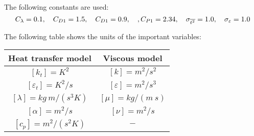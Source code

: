 The following constants are used:
\begin{equation}
C_\lambda=0.1, \quad C_{D1}=1.5, \quad C_{D1}=0.9, \quad, C_{P1}=2.34, \quad \sigma_{\overline{t^2}}=1.0, \quad \sigma_{{\varepsilon}}=1.0
\end{equation}


The following table shows the units of the important variables: 
\begin{center}
\begin{tabular}{ c | c }
 Heat transfer model & Viscous model   \\ \hline
 $\left[k_t\right]= K^2$ & $\left[k\right]= m^2 / s^2$  \\
  $\left[\varepsilon_t\right]= K^2/s$ & $\left[\varepsilon\right]= m^2 / s^3$  \\ 
  $\left[\lambda\right]= kg \ m / (s^3 K)$ & $\left[\mu\right]= kg /(m \ s)$  \\
    $\left[\alpha\right]= m^2 /s $ & $\left[\nu\right]= m^2 /s$  \\ 
        $\left[c_p\right]= m^2 /(s^2 K) $ & $-$  \\ \hline
\end{tabular}
\end{center}
